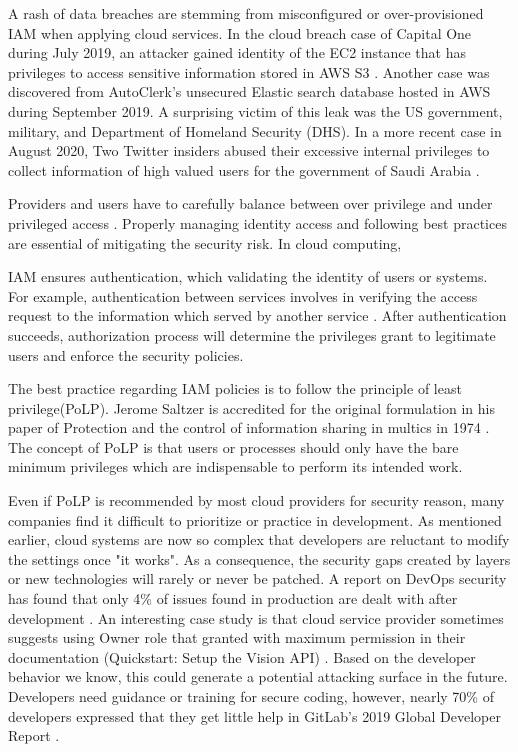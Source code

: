 \documentclass[sigconf]{acmart}
\begin{document}
A rash of data breaches are stemming from misconfigured or over-provisioned IAM when applying cloud services.
In the cloud breach case of Capital One during July 2019, an attacker gained identity of the EC2 instance that has privileges to access sensitive information stored in AWS S3 \cite{Parimi2019}. 
Another case was discovered from AutoClerk's unsecured Elastic search database hosted in AWS during September 2019. A surprising victim of this leak was the US government, military, and Department of Homeland Security (DHS). \cite{Fawkes2020}
In a more recent case in August 2020, Two Twitter insiders abused their excessive internal privileges to collect information of high valued users for the government of Saudi Arabia \cite{Newman2019}.

Providers and users have to carefully balance between over privilege and under privileged access \cite{Sanders2018}. Properly managing identity access and following best practices are essential of mitigating the security risk. 
In cloud computing, 

IAM ensures authentication, which validating the identity of users or systems. For example, authentication between services involves in verifying the access request to the information which served by another service \cite{AlmullaSameeraAbdulrahmanandYeun2010}.
After authentication succeeds, authorization process will determine the privileges grant to legitimate users and enforce the security policies.


The best practice regarding IAM policies is to follow the principle of least privilege(PoLP). Jerome Saltzer is accredited for the original formulation in  his paper of  Protection and the control of information sharing in multics in 1974 \cite{Saltzer1974}. The concept of PoLP is that users or processes should only have the bare minimum privileges which are indispensable to perform its intended work.

Even if PoLP is recommended by most cloud providers for security reason, many companies find it difficult to prioritize or practice in development. 
As mentioned earlier, cloud systems are now so complex that developers are reluctant to modify the settings once "it works". As a consequence, the security gaps created by layers or new technologies will rarely or never be patched. A report on DevOps security has found that only 4\% of issues found in production are dealt with after development \cite{Foremski}. 
An interesting case study is that cloud service provider sometimes suggests using Owner role that granted with maximum permission in their documentation (Quickstart: Setup the Vision API) \cite{GoogleVis}. Based on the developer behavior we know, this could generate a potential attacking surface in the future.
Developers need guidance or training for secure coding, however, nearly 70\% of developers expressed that they get little help in GitLab's 2019 Global Developer Report  \cite{Gitlab2019}.
\end{document}
